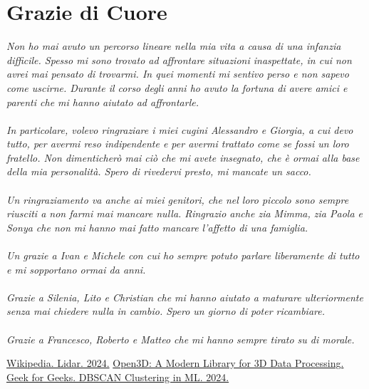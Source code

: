 \documentclass[italian]{report}
\begin{document}
\newpage
\chapter*{Grazie di Cuore}
{\ssfamily\textit{
Non ho mai avuto un percorso lineare nella mia vita a causa di una infanzia difficile. Spesso mi sono trovato ad affrontare situazioni inaspettate, in cui non avrei mai pensato di trovarmi. In quei momenti mi sentivo perso e non sapevo come uscirne. Durante il corso degli anni ho avuto la fortuna di avere amici e parenti che mi hanno aiutato ad affrontarle.\\
\\
In particolare, volevo ringraziare i miei cugini Alessandro e Giorgia, a cui devo tutto, per avermi reso indipendente e per avermi trattato come se fossi un loro fratello. Non dimenticherò mai ciò che mi avete insegnato, che è ormai alla base della mia personalità. Spero di rivedervi presto, mi mancate un sacco.\\
\\
Un ringraziamento va anche ai miei genitori, che nel loro piccolo sono sempre riusciti a non farmi mai mancare nulla. Ringrazio anche zia Mimma, zia Paola e Sonya che non mi hanno mai fatto mancare l'affetto di una famiglia.\\
\\
Un grazie a Ivan e Michele con cui ho sempre potuto parlare liberamente di tutto e mi sopportano ormai da anni.\\
\\
Grazie a Silenia, Lito e Christian che mi hanno aiutato a maturare ulteriormente senza mai chiedere nulla in cambio. Spero un giorno di poter ricambiare.\\
\\
Grazie a Francesco, Roberto e Matteo che mi hanno sempre tirato su di morale.
}}

\newpage
\begin{thebibliography}{9}
	 \href{https://it.wikipedia.org/wiki/Lidar}{Wikipedia. Lidar. 2024.}
	 \href{http://www.open3d.org/}{Open3D: A Modern Library for 3D Data Processing.}
	 \href{https://www.geeksforgeeks.org/dbscan-clustering-in-ml-density-based-clustering/}{Geek for Geeks. DBSCAN Clustering in ML. 2024.}
\end{thebibliography}
\end{document}
